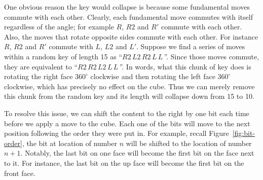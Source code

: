 \par One obvious reason the key would collapse is because some fundamental moves commute with each other. Clearly, each fundamental move commutes with itself regardless of the angle; for example $R$, $R2$ and $R'$ commute with each other. Also, the moves that rotate opposite sides commute with each other. For instance $R$, $R2$ and $R'$ commute with $L$, $L2$ and $L'$. Suppose we find a series of moves within a random key of length 15 as ``$R2\,L2\,R2\,L\,L\,$''. Since those moves commute, they are equivalent to ``$R2\,R2\,L2\,L\,L\,$''. In words, what this chunk of key does is rotating the right face $360^\circ$ clockwise and then rotating the left face $360^\circ$ clockwise, which has precisely no effect on the cube. Thus we can merely remove this chunk from the random key and its length will collapse down from 15 to 10. 
\par To resolve this issue, we can shift the content to the right by one bit each time before we apply a move to the cube. Each one of the bits will move to the next position following the order they were put in. For example, recall Figure~\ref{fig:bit-order}, the bit at location of number $n$ will be shifted to the location of number $n + 1$. Notably, the last bit on one face will become the first bit on the face next to it. For instance, the last bit on the up face will become the first bit on the front face.
